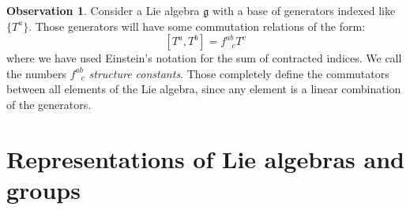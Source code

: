 \documentclass[12pt,a4paper]{report}
\theoremstyle{definition}
\theoremstyle{Theorem}
\theoremstyle{definition}
\theoremstyle{definition}
\newtheorem{Obs}[Def]{Observation}
\begin{document}
		\begin{Obs}
			Consider a Lie algebra $\mathfrak{g}$ with a base of generators indexed like $\{T^a\}$. Those generators will have some commutation relations of the form:
			$$[T^a,T^b]=f^{ab}_{\hspace{9pt}c}T^c$$
			where we have used Einstein's notation for the sum of contracted indices. We call the numbers $f^{ab}_{\hspace{9pt}c}$ \textit{structure constants}. Those completely define the commutators between all elements of the Lie algebra, since any element is a linear combination of the generators.
		\end{Obs}
		\section{Representations of Lie algebras and groups}
\end{document}
